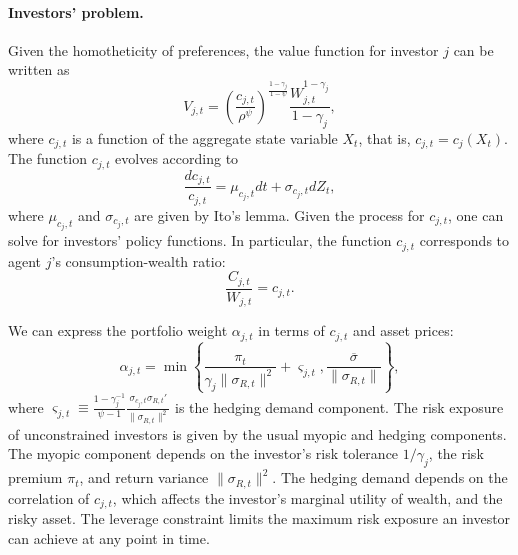 \paragraph{Investors' problem.} Given the homotheticity of preferences, the value function for investor $j$ can be written as
\begin{equation}\nonumber
    V_{j,t} = \left( \frac{c_{j,t}}{\rho^\psi} \right)^{\frac{1-\gamma_j}{1-\psi}} \frac{W_{j,t}^{1-\gamma_j}}{1-\gamma_j},
\end{equation}
where $c_{j,t}$ is a function of the aggregate state variable $X_t$, that is, $c_{j,t} = c_j(X_t)$. The function $c_{j,t}$ evolves according to
\begin{equation}\nonumber
    \frac{d c_{j,t}}{c_{j,t}} = \mu_{c_j,t} dt + \sigma_{c_j,t} d Z_t,
\end{equation}
where $\mu_{c_j,t}$ and $\sigma_{c_j,t}$ are given by Ito's lemma. 
Given the process for $c_{j,t}$, one can solve for investors' policy functions. In particular, the function $c_{j,t}$ corresponds to agent $j$'s consumption-wealth ratio:
\begin{equation}\nonumber
    \frac{C_{j,t}}{W_{j,t}} = c_{j,t}.
\end{equation}

We can express the portfolio weight $\alpha_{j,t}$ in terms of $c_{j,t}$ and asset prices: 
\begin{equation}\label{eq:portfolio_share}
    \alpha_{j,t} = \min \left\{ \frac{\pi_t}{\gamma_j \|\sigma_{R,t}\|^2}  + \varsigma_{j,t}, \frac{\overline{\sigma}}{\|\sigma_{R,t}\|} \right\}, 
\end{equation}
where $\varsigma_{j,t} \equiv \frac{1-\gamma_j^{-1}}{\psi-1} \frac{\sigma_{c_j,t} \sigma_{R,t}'}{\|\sigma_{R,t}\|^2}$ is the hedging demand component.
The risk exposure of unconstrained investors is given by the usual myopic and hedging components. The myopic component depends on the investor's risk tolerance $1/\gamma_j$, the risk premium $\pi_t$, and return variance $\|\sigma_{R,t}\|^2$. The hedging demand depends on the correlation of $c_{j,t}$, which affects the investor's marginal utility of wealth, and the risky asset. The leverage constraint limits the maximum risk exposure an investor can achieve at any point in time. 

